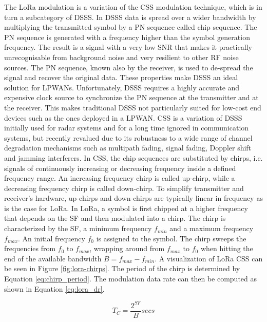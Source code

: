 The LoRa modulation is a variation of the \gls{CSS} modulation technique, which is in turn a subcategory of \gls{DSSS}. In \gls{DSSS} data is spread over a wider bandwidth by multiplying the transmitted symbol by a \gls{PN} sequence called chip sequence. The \gls{PN} sequence is generated with a frequency higher than the symbol generation frequency. The result is a signal with a very low \gls{SNR} that makes it practically unrecognisable from background noise and very resilient to other \gls{RF} noise sources. The \gls{PN} sequence, known also by the receiver, is used to de-spread the signal and recover the original data. These properties make \gls{DSSS} an ideal solution for \glspl{LPWAN}. Unfortunately, \gls{DSSS} requires a highly accurate and expensive clock source to synchronize the \gls{PN} sequence at the transmitter and at the receiver. This makes traditional \gls{DSSS} not particularly suited for low-cost end devices such as the ones deployed in a \gls{LPWAN}.
\gls{CSS} is a variation of \gls{DSSS} initially used for radar systems and for a long time ignored in communication systems, but recently revalued due to its robustness to a wide range of channel degradation mechanisms such as multipath fading, signal fading, Doppler shift and jamming interferers.
In \gls{CSS}, the chip sequences are substituted by chirps, i.e. signals of continuously increasing or decreasing frequency inside a defined frequency range. An increasing frequency chirp is called up-chirp, while a decreasing frequency chirp is called down-chirp. To simplify transmitter and receiver's hardware, up-chirps and down-chirps are typically linear in frequency as is the case for LoRa.
In LoRa, a symbol is first chipped at a higher frequency that depends on the \gls{SF} and then modulated into a chirp. The chirp is characterized by the \gls{SF}, a minimum frequency $f_{min}$ and a maximum frequency $f_{max}$. An initial frequency $f_0$ is assigned to the symbol. The chirp sweeps the frequencies from $f_0$ to $f_{max}$, wrapping around from $f_{max}$ to $f_0$ when hitting the end of the available bandwidth $B = f_{max} - f_{min}$. A visualization of LoRa \gls{CSS} can be seen in Figure \ref{fig:lora-chirps}. The period of the chirp is determined by Equation \ref{eq:chirp_period}. The modulation data rate can then be computed as shown in Equation \ref{eq:lora_dr}.

\begin{equation}
\label{eq:chirp_period}
T_C = \frac{2^{SF}}{B} secs
\end{equation}


